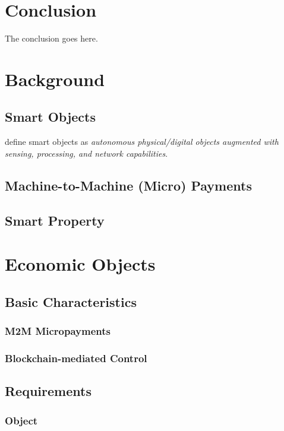 \section{Conclusion}
The conclusion goes here.


\section{Background}

\subsection{Smart Objects}

\cite{kortuem2010smart} define smart objects as \emph{autonomous physical/digital objects augmented with sensing, processing, and network capabilities}. 

\subsection{Machine-to-Machine (Micro) Payments}

\subsection{Smart Property}




\section{Economic Objects}

\subsection{Basic Characteristics}

\subsubsection{M2M Micropayments}

\subsubsection{Blockchain-mediated Control}

\subsection{Requirements}

\subsubsection{Object}

